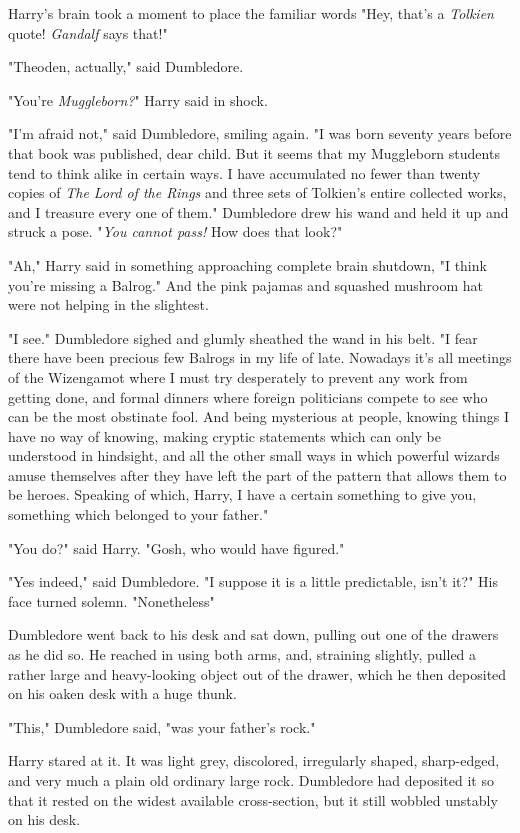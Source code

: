 Harry's brain took a moment to place the familiar words{\el} "Hey, that's a
\emph{Tolkien} quote! \emph{Gandalf} says that!"

"Theoden, actually," said Dumbledore.

"You're \emph{Muggleborn?}" Harry said in shock.

"I'm afraid not," said Dumbledore, smiling again. "I was born seventy years
before that book was published, dear child. But it seems that my Muggleborn
students tend to think alike in certain ways. I have accumulated no fewer than
twenty copies of \emph{The Lord of the Rings} and three sets of Tolkien's
entire collected works, and I treasure every one of them." Dumbledore drew his
wand and held it up and struck a pose. "\emph{You cannot pass!} How does that
look?"

"Ah," Harry said in something approaching complete brain shutdown, "I think
you're missing a Balrog." And the pink pajamas and squashed mushroom hat were
not helping in the slightest.

"I see." Dumbledore sighed and glumly sheathed the wand in his belt. "I fear
there have been precious few Balrogs in my life of late. Nowadays it's all
meetings of the Wizengamot where I must try desperately to prevent any work
from getting done, and formal dinners where foreign politicians compete to see
who can be the most obstinate fool. And being mysterious at people, knowing
things I have no way of knowing, making cryptic statements which can only be
understood in hindsight, and all the other small ways in which powerful wizards
amuse themselves after they have left the part of the pattern that allows them
to be heroes. Speaking of which, Harry, I have a certain something to give you,
something which belonged to your father."

"You do?" said Harry. "Gosh, who would have figured."

"Yes indeed," said Dumbledore. "I suppose it is a little predictable, isn't
it?" His face turned solemn. "Nonetheless{\el}"

Dumbledore went back to his desk and sat down, pulling out one of the drawers
as he did so. He reached in using both arms, and, straining slightly, pulled a
rather large and heavy-looking object out of the drawer, which he then
deposited on his oaken desk with a huge thunk.

"This," Dumbledore said, "was your father's rock."

Harry stared at it. It was light grey, discolored, irregularly shaped,
sharp-edged, and very much a plain old ordinary large rock. Dumbledore had
deposited it so that it rested on the widest available cross-section, but it
still wobbled unstably on his desk.

